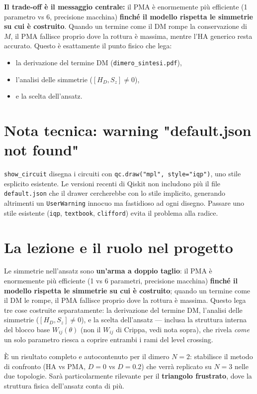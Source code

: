 \documentclass[11pt,a4paper]{article}
\begin{document}
\textbf{Il trade-off è il messaggio centrale:} il PMA è enormemente più
efficiente (1 parametro vs 6, precisione macchina) \textbf{finché il
modello rispetta le simmetrie su cui è costruito}. Quando un termine
come il DM rompe la conservazione di $M$, il PMA fallisce proprio dove
la rottura è massima, mentre l'HA generico resta accurato. Questo è
esattamente il punto fisico che lega:
\begin{itemize}[leftmargin=1.3em,itemsep=0.1em]
\item la derivazione del termine DM (\texttt{dimero\_sintesi.pdf}),
\item l'analisi delle simmetrie ($[H_D,S_z]\neq0$),
\item e la scelta dell'ansatz.
\end{itemize}

\section*{Nota tecnica: warning "default.json not found"}

\texttt{show\_circuit} disegna i circuiti con
\texttt{qc.draw("mpl", style="iqp")}, uno stile esplicito esistente. Le
versioni recenti di Qiskit non includono più il file
\texttt{default.json} che il drawer cercherebbe con lo stile implicito,
generando altrimenti un \texttt{UserWarning} innocuo ma fastidioso ad
ogni disegno. Passare uno stile esistente (\texttt{iqp},
\texttt{textbook}, \texttt{clifford}) evita il problema alla radice.

\section*{La lezione e il ruolo nel progetto}

Le simmetrie nell'ansatz sono \textbf{un'arma a doppio taglio}: il PMA è
enormemente più efficiente (1 vs 6 parametri, precisione macchina)
\textbf{finché il modello rispetta le simmetrie su cui è costruito};
quando un termine come il DM le rompe, il PMA fallisce proprio dove la
rottura è massima. Questo lega tre cose costruite separatamente: la
derivazione del termine DM, l'analisi delle simmetrie
($[H_D,S_z]\neq0$), e la scelta dell'ansatz --- inclusa la struttura
interna del blocco base $W_{ij}(\theta)$ (non il $W_{ij}$ di Crippa,
vedi nota sopra), che rivela \emph{come} un solo
parametro riesca a coprire entrambi i rami del level crossing.

È un risultato completo e autocontenuto per il dimero $N=2$: stabilisce
il metodo di confronto (HA vs PMA, $D=0$ vs $D=0.2$) che verrà
replicato su $N=3$ nelle due topologie. Sarà particolarmente rilevante
per il \textbf{triangolo frustrato}, dove la struttura fisica
dell'ansatz conta di più.
\end{document}
